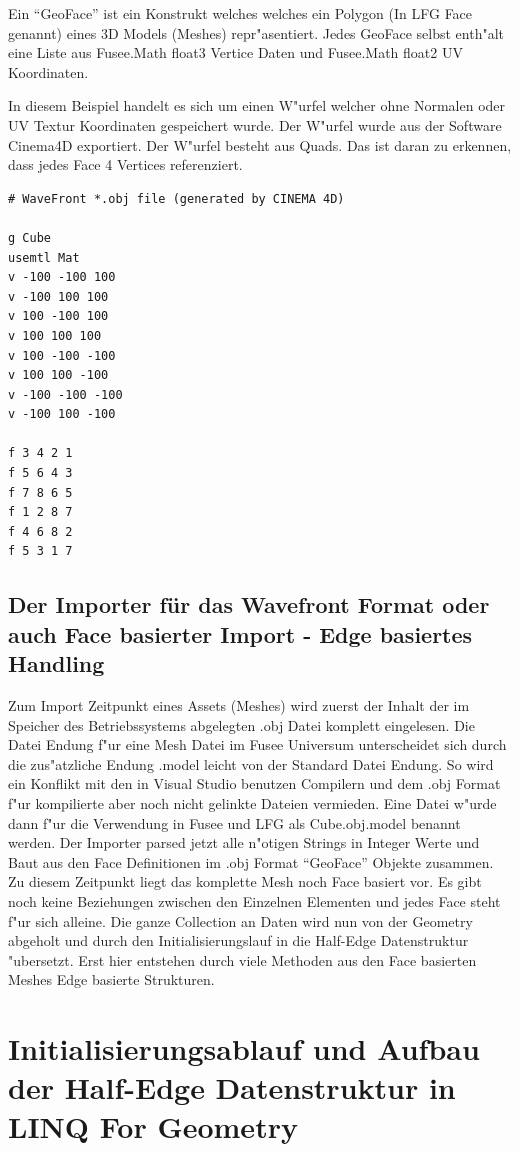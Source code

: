 \documentclass[pagesize, paper=a4, fontsize=12pt,titlepage=true, headings=small, headnosepline, abstractoff, liststotoc, nochapterprefix, plainheadsepline]{scrreprt}
\newcommand{\LFG}{LINQ For Geometry}
\newcommand{\HES}{Half-Edge Datenstruktur }
\begin{document}
Ein "`GeoFace"' ist ein Konstrukt welches welches ein Polygon (In LFG Face genannt) eines 3D Models (Meshes) repr"asentiert. Jedes GeoFace selbst enth"alt eine Liste aus Fusee.Math float3 Vertice Daten und Fusee.Math float2 UV Koordinaten.
\newline

In diesem Beispiel handelt es sich um einen W"urfel welcher ohne Normalen oder UV Textur Koordinaten gespeichert wurde. Der W"urfel wurde aus der Software Cinema4D exportiert. Der W"urfel besteht aus Quads. Das ist daran zu erkennen, dass jedes Face 4 Vertices referenziert.
\begin{lstlisting}
# WaveFront *.obj file (generated by CINEMA 4D)

g Cube
usemtl Mat
v -100 -100 100
v -100 100 100
v 100 -100 100
v 100 100 100
v 100 -100 -100
v 100 100 -100
v -100 -100 -100
v -100 100 -100

f 3 4 2 1 
f 5 6 4 3 
f 7 8 6 5 
f 1 2 8 7 
f 4 6 8 2 
f 5 3 1 7 
\end{lstlisting}

		\subsection {Der Importer für das Wavefront Format oder auch Face basierter Import - Edge basiertes Handling}
			Zum Import Zeitpunkt eines Assets (Meshes) wird zuerst der Inhalt der im Speicher des Betriebssystems abgelegten .obj Datei komplett eingelesen. Die Datei Endung f"ur eine Mesh Datei im Fusee Universum unterscheidet sich durch die zus"atzliche Endung .model leicht von der Standard Datei Endung. So wird ein Konflikt mit den in Visual Studio benutzen Compilern und dem .obj Format f"ur kompilierte aber noch nicht gelinkte Dateien vermieden. Eine Datei w"urde dann f"ur die Verwendung in Fusee und LFG als Cube.obj.model benannt werden. Der Importer parsed jetzt alle n"otigen Strings in Integer Werte und Baut aus den Face Definitionen im .obj Format "`GeoFace"' Objekte zusammen. Zu diesem Zeitpunkt liegt das komplette Mesh noch Face basiert vor. Es gibt noch keine Beziehungen zwischen den Einzelnen Elementen und jedes Face steht f"ur sich alleine. Die ganze Collection an Daten wird nun von der Geometry abgeholt und durch den Initialisierungslauf in die \HES "ubersetzt. Erst hier entstehen durch viele Methoden aus den Face basierten Meshes Edge basierte Strukturen.
	\section {Initialisierungsablauf und Aufbau der \HES in \LFG}
\end{document}
